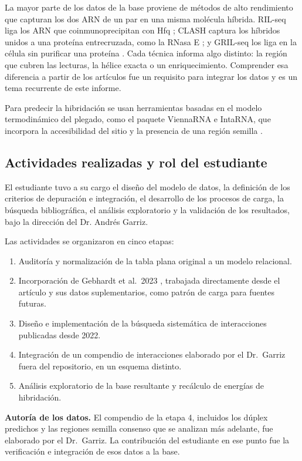 \documentclass[11pt,a4paper]{article}
\begin{document}
La mayor parte de los datos de la base proviene de métodos de alto rendimiento que capturan los dos ARN de un par en una misma molécula híbrida. RIL-seq liga los ARN que coinmunoprecipitan con Hfq \cite{melamed2016}; CLASH captura los híbridos unidos a una proteína entrecruzada, como la RNasa E \cite{waters2017}; y GRIL-seq los liga en la célula sin purificar una proteína \cite{han2016}. Cada técnica informa algo distinto: la región que cubren las lecturas, la hélice exacta o un enriquecimiento. Comprender esa diferencia a partir de los artículos fue un requisito para integrar los datos y es un tema recurrente de este informe.

Para predecir la hibridación se usan herramientas basadas en el modelo termodinámico del plegado, como el paquete ViennaRNA \cite{lorenz2011} e IntaRNA, que incorpora la accesibilidad del sitio y la presencia de una región semilla \cite{busch2008,mann2017}.

\subsection{Actividades realizadas y rol del estudiante}

El estudiante tuvo a su cargo el diseño del modelo de datos, la definición de los criterios de depuración e integración, el desarrollo de los procesos de carga, la búsqueda bibliográfica, el análisis exploratorio y la validación de los resultados, bajo la dirección del Dr. Andrés Garriz.

Las actividades se organizaron en cinco etapas:
\begin{enumerate}
  \item Auditoría y normalización de la tabla plana original a un modelo relacional.
  \item Incorporación de Gebhardt et al.\ 2023 \cite{gebhardt2023}, trabajada directamente desde el artículo y sus datos suplementarios, como patrón de carga para fuentes futuras.
  \item Diseño e implementación de la búsqueda sistemática de interacciones publicadas desde 2022.
  \item Integración de un compendio de interacciones elaborado por el Dr.\ Garriz fuera del repositorio, en un esquema distinto.
  \item Análisis exploratorio de la base resultante y recálculo de energías de hibridación.
\end{enumerate}

\textbf{Autoría de los datos.} El compendio de la etapa 4, incluidos los dúplex predichos y las regiones semilla consenso que se analizan más adelante, fue elaborado por el Dr.\ Garriz. La contribución del estudiante en ese punto fue la verificación e integración de esos datos a la base.
\end{document}
